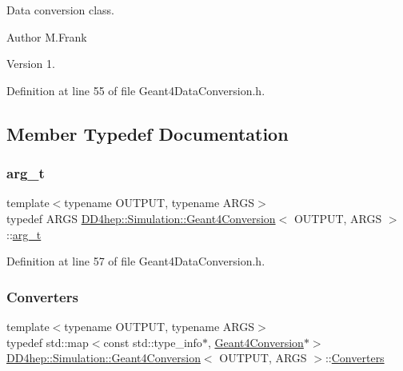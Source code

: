 Data conversion class. 

\begin{DoxyAuthor}{Author}
M.\+Frank 
\end{DoxyAuthor}
\begin{DoxyVersion}{Version}
1. 
\end{DoxyVersion}


Definition at line 55 of file Geant4\+Data\+Conversion.\+h.



\subsection{Member Typedef Documentation}
\hypertarget{class_d_d4hep_1_1_simulation_1_1_geant4_conversion_a2a9680db46d2a136982d290c9b11e6f8}{}\label{class_d_d4hep_1_1_simulation_1_1_geant4_conversion_a2a9680db46d2a136982d290c9b11e6f8} 
\subsubsection{\texorpdfstring{arg\+\_\+t}{arg\_t}}
{\footnotesize\ttfamily template$<$typename O\+U\+T\+P\+UT, typename A\+R\+GS$>$ \\
typedef A\+R\+GS \hyperlink{class_d_d4hep_1_1_simulation_1_1_geant4_conversion}{D\+D4hep\+::\+Simulation\+::\+Geant4\+Conversion}$<$ O\+U\+T\+P\+UT, A\+R\+GS $>$\+::\hyperlink{class_d_d4hep_1_1_simulation_1_1_geant4_conversion_a2a9680db46d2a136982d290c9b11e6f8}{arg\+\_\+t}}



Definition at line 57 of file Geant4\+Data\+Conversion.\+h.

\hypertarget{class_d_d4hep_1_1_simulation_1_1_geant4_conversion_a1e6c074730135cc207cbd8d8030a189f}{}\label{class_d_d4hep_1_1_simulation_1_1_geant4_conversion_a1e6c074730135cc207cbd8d8030a189f} 
\subsubsection{\texorpdfstring{Converters}{Converters}}
{\footnotesize\ttfamily template$<$typename O\+U\+T\+P\+UT, typename A\+R\+GS$>$ \\
typedef std\+::map$<$const std\+::type\+\_\+info$\ast$, \hyperlink{class_d_d4hep_1_1_simulation_1_1_geant4_conversion}{Geant4\+Conversion}$\ast$$>$ \hyperlink{class_d_d4hep_1_1_simulation_1_1_geant4_conversion}{D\+D4hep\+::\+Simulation\+::\+Geant4\+Conversion}$<$ O\+U\+T\+P\+UT, A\+R\+GS $>$\+::\hyperlink{class_d_d4hep_1_1_simulation_1_1_geant4_conversion_a1e6c074730135cc207cbd8d8030a189f}{Converters}}



